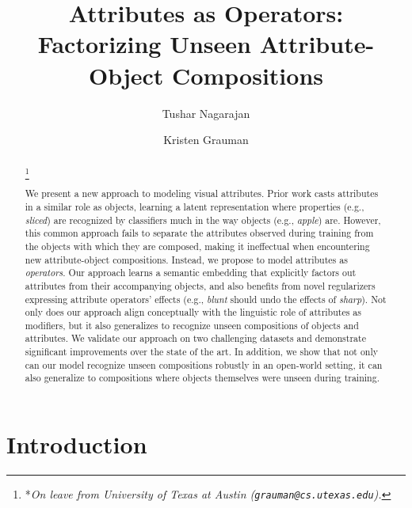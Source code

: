\documentclass[runningheads]{llncs}
\newcommand\blfootnote[1]{\begingroup
  \renewcommand\thefootnote{}\footnote{#1}\addtocounter{footnote}{-1}\endgroup
}
\begin{document}
\title{Attributes as Operators: \\
Factorizing  Unseen Attribute-Object Compositions}


\author{
	Tushar Nagarajan \and Kristen Grauman }



\maketitle              \begin{abstract}
\blfootnote{*\emph{On leave from University of Texas at Austin (\texttt{grauman@cs.utexas.edu}).}}
We present a new approach to modeling visual attributes.  Prior work casts attributes in a similar role as objects, learning a latent representation where properties (e.g., \emph{sliced}) are recognized by classifiers much in the way objects (e.g., \emph{apple})  are. 
However, this common approach fails to separate the attributes observed during training from the objects with which they are composed, making it ineffectual when encountering new attribute-object compositions.  Instead, we propose to model attributes as \emph{operators}. Our approach learns a semantic embedding that explicitly factors out attributes from their accompanying objects, and also benefits from novel regularizers expressing attribute operators' effects (e.g., \emph{blunt} should undo the effects of \emph{sharp}).  
Not only does our approach align conceptually with the linguistic role of attributes as modifiers, but it also generalizes to recognize unseen compositions of objects and attributes. We validate our approach on two challenging datasets and demonstrate significant improvements over the state of the art. In addition, we show that not only can our model recognize unseen compositions robustly in an open-world setting, it can also generalize to compositions where objects themselves were unseen during training. \end{abstract}
\section{Introduction}
\end{document}
